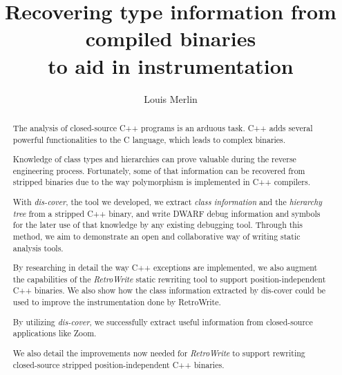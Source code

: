 \documentclass[a4paper,11pt,oneside]{report}
\title{Recovering type information from compiled binaries\\to aid in 
instrumentation}
\author{Louis Merlin}
\begin{document}
\maketitle
\makededication
\makeacks

\begin{abstract}

The analysis of closed-source C++ programs is an arduous task.
C++ adds several powerful functionalities to the C language, which leads to
complex binaries.

Knowledge of class types and hierarchies can prove valuable during the reverse
engineering process.
Fortunately, some of that information can be recovered from stripped binaries
due to the way polymorphism is implemented in C++ compilers.

With \emph{dis-cover}, the tool we developed, we extract \emph{class
information} and the \emph{hierarchy tree} from a stripped C++ binary, and
write DWARF debug information and symbols for the later use of that knowledge
by any existing debugging tool.
Through this method, we aim to demonstrate an open and collaborative way of
writing static analysis tools.

By researching in detail the way C++ exceptions are implemented, we also
augment the capabilities of the \emph{RetroWrite} static rewriting tool to
support position-independent C++ binaries.
We also show how the class information extracted by dis-cover could be used to
improve the instrumentation done by RetroWrite.

By utilizing \emph{dis-cover}, we successfully extract useful information from
closed-source applications like Zoom.

We also detail the improvements now needed for \emph{RetroWrite} to support
rewriting closed-source stripped position-independent C++ binaries.

\end{abstract}

\end{document}
